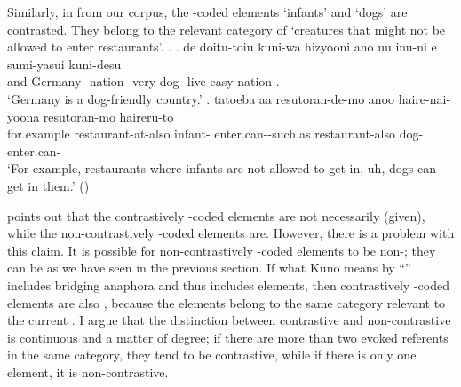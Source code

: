 Similarly, in \Next from our corpus,
the -coded elements  `infants' and  `dogs' are contrasted.
They belong to the relevant category of `creatures that might not be allowed to enter restaurants'.
%
\ex.
 \ag. de doitu-toiu kuni-wa hizyooni ano uu inu-ni e sumi-yasui kuni-desu \\
 	and Germany- nation- very   dog-  live-easy nation-. \\
	`Germany is a dog-friendly country.'
 \bg. tatoeba aa resutoran-de-mo anoo  haire-nai-yoona resutoran-mo  haireru-to \\
 	for.example  restaurant-at-also  infant- enter.can--such.as restaurant-also dog- enter.can- \\
 	`For example, restaurants where infants are not allowed to get in, uh, dogs can get in them.'
	\hfill{()}


 points out that
the contrastively -coded elements are not necessarily  (given),
while the non-contrastively -coded elements are.
However, there is a problem with this claim.
It is possible for non-contrastively -coded elements to be non-;
they can be  as we have seen in the previous section.
If what Kuno means by ``'' includes bridging anaphora \cite{clark75} and thus includes  elements,
then contrastively -coded elements are also ,
because the elements belong to the same category relevant to the current .
I argue that the distinction between contrastive and non-contrastive is continuous and a matter of degree;
if there are more than two evoked referents in the same category,
they tend to be contrastive,
while if there is only one element,
it is non-contrastive.
%
%




